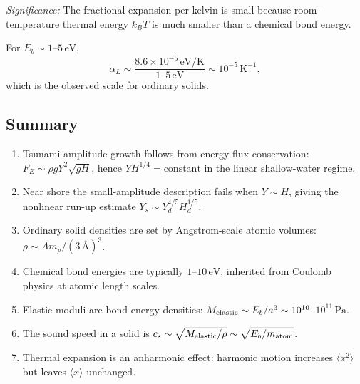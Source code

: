 \textit{Significance:} The fractional expansion per kelvin is small because
room-temperature thermal energy $k_BT$ is much smaller than a chemical bond
energy.

For $E_b\sim1$--$5\,\text{eV}$,
\begin{equation}
    \alpha_L\sim\frac{8.6\times10^{-5}\,\text{eV/K}}{1\text{--}5\,\text{eV}}
    \sim 10^{-5}\,\text{K}^{-1},
    \label{eq:lec11:alpha-number}
\end{equation}
which is the observed scale for ordinary solids.


\subsection{Summary}
\label{sec:lec11:summary}

\begin{enumerate}
    \item Tsunami amplitude growth follows from energy flux conservation:
    $F_E\sim\rho gY^2\sqrt{gH}$, hence $YH^{1/4}=\text{constant}$ in the linear
    shallow-water regime.
    \item Near shore the small-amplitude description fails when $Y\sim H$,
    giving the nonlinear run-up estimate $Y_s\sim Y_d^{4/5}H_d^{1/5}$.
    \item Ordinary solid densities are set by Angstrom-scale atomic volumes:
    $\rho\sim Am_p/(3\,\text{\AA})^3$.
    \item Chemical bond energies are typically $1$--$10\,\text{eV}$, inherited
    from Coulomb physics at atomic length scales.
    \item Elastic moduli are bond energy densities:
    $M_{\rm elastic}\sim E_b/a^3\sim10^{10}$--$10^{11}\,\text{Pa}$.
    \item The sound speed in a solid is
    $c_s\sim\sqrt{M_{\rm elastic}/\rho}\sim\sqrt{E_b/m_{\rm atom}}$.
    \item Thermal expansion is an anharmonic effect: harmonic motion increases
    $\langle x^2\rangle$ but leaves $\langle x\rangle$ unchanged.
\end{enumerate}
